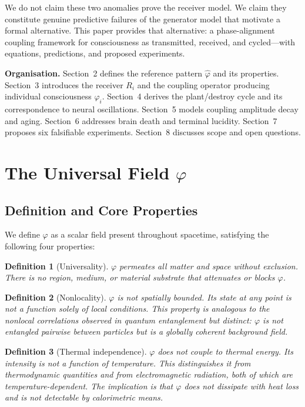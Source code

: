 \documentclass[12pt]{article}
\newtheorem{definition}{Definition}
\begin{document}
We do not claim these two anomalies prove the receiver model. We claim they constitute genuine predictive failures of the generator model that motivate a formal alternative. This paper provides that alternative: a phase-alignment coupling framework for consciousness as transmitted, received, and cycled---with equations, predictions, and proposed experiments.

\textbf{Organisation.} Section~2 defines the reference pattern $\hat{\varphi}$ and its properties. Section~3 introduces the receiver $R_i$ and the coupling operator producing individual consciousness $\varphi_i$. Section~4 derives the plant/destroy cycle and its correspondence to neural oscillations. Section~5 models coupling amplitude decay and aging. Section~6 addresses brain death and terminal lucidity. Section~7 proposes six falsifiable experiments. Section~8 discusses scope and open questions.

\section{The Universal Field \texorpdfstring{$\varphi$}{phi}}

\subsection{Definition and Core Properties}

We define $\varphi$ as a scalar field present throughout spacetime, satisfying the following four properties:

\begin{definition}[Universality]
$\varphi$ permeates all matter and space without exclusion. There is no region, medium, or material substrate that attenuates or blocks $\varphi$.
\end{definition}

\begin{definition}[Nonlocality]
$\varphi$ is not spatially bounded. Its state at any point is not a function solely of local conditions. This property is analogous to the nonlocal correlations observed in quantum entanglement \cite{bell1964} but distinct: $\varphi$ is not entangled pairwise between particles but is a globally coherent background field.
\end{definition}

\begin{definition}[Thermal independence]
$\varphi$ does not couple to thermal energy. Its intensity is not a function of temperature. This distinguishes it from thermodynamic quantities and from electromagnetic radiation, both of which are temperature-dependent. The implication is that $\varphi$ does not dissipate with heat loss and is not detectable by calorimetric means.
\end{definition}
\end{document}
